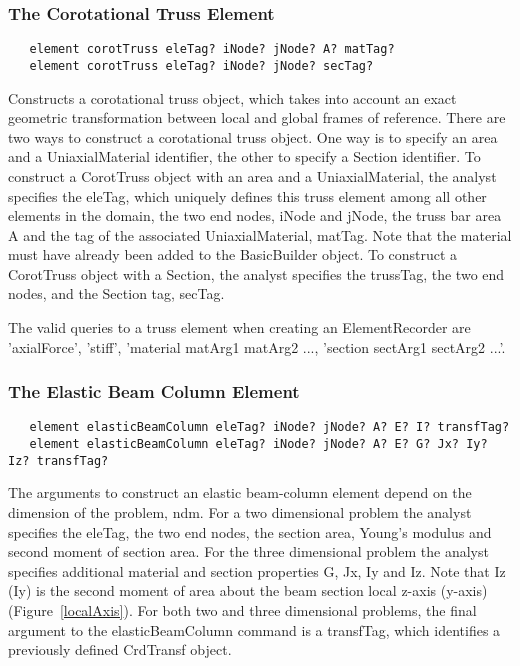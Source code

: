 \documentclass[12pt]{article}
\begin{document}
\subsubsection{The Corotational Truss Element}
{\sf\small
\begin{verbatim}
   element corotTruss eleTag? iNode? jNode? A? matTag?
   element corotTruss eleTag? iNode? jNode? secTag?
\end{verbatim}
}

\noindent Constructs a corotational truss object, which takes into account
an exact geometric transformation between local and global frames of reference.
There are two ways to construct a corotational truss object.
One way is to specify an area and a UniaxialMaterial identifier, the other to specify a
Section identifier. To construct a CorotTruss object with an area and a
UniaxialMaterial, the analyst specifies the eleTag, which uniquely defines
this truss element among all other elements in the domain, the two end
nodes, iNode and jNode, the truss bar area A and the tag of the
associated UniaxialMaterial, matTag. Note that the material must have already
been added to the BasicBuilder object. To construct a CorotTruss object
with a Section, the analyst specifies the trussTag, the two end nodes,
and the Section tag, secTag. 

The valid queries to a truss element when creating an ElementRecorder
are 'axialForce', 'stiff', 'material matArg1 matArg2 ..., 'section sectArg1
sectArg2 ...'.

\subsubsection{The Elastic Beam Column Element}
{\sf\small
\begin{verbatim}
   element elasticBeamColumn eleTag? iNode? jNode? A? E? I? transfTag?
   element elasticBeamColumn eleTag? iNode? jNode? A? E? G? Jx? Iy? Iz? transfTag?
\end{verbatim}
}

\noindent The arguments to construct an elastic beam-column element depend on
the dimension of the problem, ndm. For a two dimensional problem the
analyst specifies the eleTag, the two end nodes, the section area,
Young's modulus and second moment of section area. For the three dimensional
problem the analyst specifies additional material and
section properties G, Jx, Iy and Iz. Note that Iz (Iy) is the second
moment of area about the beam section local z-axis (y-axis)
(Figure~\ref{localAxis}). For both two and three dimensional problems,
the final argument to the elasticBeamColumn command is a transfTag,
which identifies a previously defined CrdTransf object. 
\end{document}
